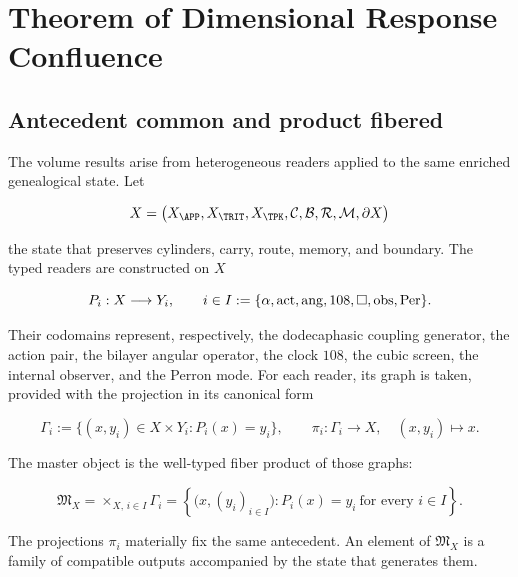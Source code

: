 \section{Theorem of Dimensional Response Confluence}
\label{rm:ch:confluencia-general}

\subsection{Antecedent common and product fibered}

The volume results arise from heterogeneous readers applied to
the same enriched genealogical state. Let

\begin{equation}
 X=\bigl(X_{\APP},X_{\TRIT},X_{\TPK},
          \mathcal C,\mathcal B,\mathcal R,\mathcal M,\partial X\bigr)
 \label{rm:eq:confluence-state}
\end{equation}

the state that preserves cylinders, carry, route, memory, and boundary. The typed
readers are constructed on \(X\)

\begin{equation}
 P_i:X\longrightarrow Y_i,
 \qquad
 i\in I:=\{\alpha,{\rm act},{\rm ang},108,\square,{\rm obs},{\rm Per}\}.
 \label{rm:eq:confluence-objects}
\end{equation}

Their codomains represent, respectively, the dodecaphasic
coupling generator, the action pair, the bilayer angular operator, the clock
\(108\), the cubic screen, the internal observer, and the Perron mode.
For each reader, its graph is taken, provided with the projection in its canonical form

\begin{equation}
 \Gamma_i:=\{(x,y_i)\in X\times Y_i:P_i(x)=y_i\},
 \qquad
 \pi_i:\Gamma_i\longrightarrow X,
 \quad (x,y_i)\longmapsto x.
 \label{rm:eq:confluence-reader-graphs}
\end{equation}

The master object is the well-typed fiber product of those graphs:

\begin{equation}
 \boxed{
 \mathfrak M_X=
 \mathop{\times}_{X,\,i\in I}\Gamma_i
 =\left\{\bigl(x,(y_i)_{i\in I}\bigr):
 P_i(x)=y_i\ \text{for every }i\in I\right\}.}
 \label{rm:eq:master-fiber-product}
\end{equation}

The projections \(\pi_i\) materially fix the same antecedent. An
element of \(\mathfrak M_X\) is a family of compatible outputs
accompanied by the state that generates them.

